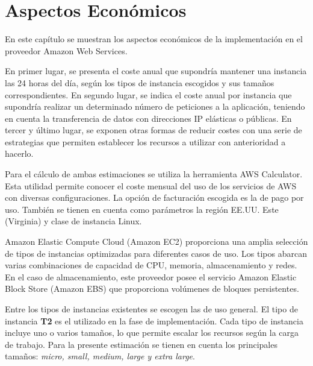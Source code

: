 \chapter{Aspectos Económicos}
\label{cha:economic}

En este capítulo se muestran los aspectos económicos de la implementación en el proveedor Amazon Web Services. 

En primer lugar, se presenta el coste anual que supondría mantener una instancia las 24 horas del día, según los tipos de instancia escogidos y sus tamaños correspondientes. En segundo lugar, se indica el coste anual por instancia que supondría realizar un determinado número de peticiones a la aplicación, teniendo en cuenta la transferencia de datos con direcciones IP elásticas o públicas. En tercer y último lugar, se exponen otras formas de reducir costes con una serie de estrategias que permiten establecer los recursos a utilizar con anterioridad a hacerlo.

Para el cálculo de ambas estimaciones se utiliza la herramienta AWS Calculator\cite{AWS Calculator}. Esta utilidad permite conocer el coste mensual del uso de los servicios de AWS con diversas configuraciones. La opción de facturación escogida es la de pago por uso. También se tienen en cuenta como parámetros la región EE.UU. Este (Virginia) y clase de instancia Linux.

Amazon Elastic Compute Cloud (Amazon EC2) proporciona una amplia selección de tipos de instancias optimizadas para diferentes casos de uso. Los tipos abarcan varias combinaciones de capacidad de CPU, memoria, almacenamiento y redes. En el caso de almacenamiento, este proveedor posee el servicio Amazon Elastic Block Store (Amazon EBS)\cite{AWS EBS} que proporciona volúmenes de bloques persistentes.

Entre los tipos de instancias existentes se escogen las de uso general. El tipo de instancia \textbf{T2} es el utilizado en la fase de implementación. Cada tipo de instancia incluye uno o varios tamaños, lo que permite escalar los recursos según la carga de trabajo. Para la presente estimación se tienen en cuenta los principales tamaños: \textit{micro, small, medium, large y extra large}.

